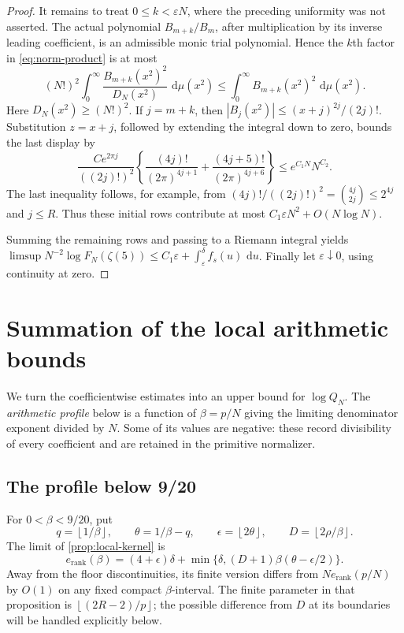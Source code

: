 \documentclass[11pt,letterpaper]{article}
\theoremstyle{definition}
\newcommand{\dd}{\,\mathrm d}
\newcommand{\floor}[1]{\left\lfloor #1\right\rfloor}
\begin{document}
\begin{proof}
It remains to treat $0\le k<\varepsilon N$, where the preceding uniformity
was not asserted. The actual polynomial $B_{m+k}/B_m$, after multiplication
by its inverse leading coefficient, is an admissible monic trial
polynomial. Hence the $k$th factor in \eqref{eq:norm-product} is at most
\[
 (N!)^2\int_0^\infty\frac{B_{m+k}(x^2)^2}{D_N(x^2)}
                         \,\dd\mu(x^2)
 \le\int_0^\infty B_{m+k}(x^2)^2\,\dd\mu(x^2).
\]
Here $D_N(x^2)\ge(N!)^2$. If $j=m+k$, then
$|B_j(x^2)|\le(x+j)^{2j}/(2j)!$. Substitution $z=x+j$, followed by extending
the integral down to zero, bounds the last display by
\[
 \frac{Ce^{2\pi j}}{((2j)!)^2}
 \left\{\frac{(4j)!}{(2\pi)^{4j+1}}
       +\frac{(4j+5)!}{(2\pi)^{4j+6}}\right\}
 \le e^{C_1N}N^{C_2}.
\]
The last inequality follows, for example, from
$(4j)!/((2j)!)^2=\binom{4j}{2j}\le2^{4j}$ and $j\le R$.
Thus these initial rows contribute at most
$C_1\varepsilon N^2+O(N\log N)$.

Summing the remaining rows and passing to a Riemann integral yields
$\limsup N^{-2}\log F_N(\zeta(5))
\le C_1\varepsilon+\int_\varepsilon^\delta f_s(u)\,\dd u$.
Finally let $\varepsilon\downarrow0$, using continuity at zero.
\end{proof}


\section{Summation of the local arithmetic bounds}\label{sec:arithmetic}

We turn the coefficientwise estimates into an upper bound for
$\log Q_N$. The \emph{arithmetic profile} below is a function of
$\beta=p/N$ giving the limiting denominator exponent divided by $N$.
Some of its values are negative: these record divisibility of every
coefficient and are retained in the primitive normalizer.

\subsection{The profile below 9/20}
For $0<\beta<9/20$, put
\[
 q=\floor{1/\beta},\qquad
 \theta=1/\beta-q,\qquad
 \epsilon=\floor{2\theta},\qquad
 D=\floor{2\rho/\beta}.
\]
The limit of \cref{prop:local-kernel} is
\begin{equation}\label{eq:rank-profile}
 e_{\mathrm{rank}}(\beta)
 =(4+\epsilon)\delta+
 \min\{\delta,(D+1)\beta(\theta-\epsilon/2)\}.
\end{equation}
Away from the floor discontinuities, its finite version differs from
$Ne_{\mathrm{rank}}(p/N)$ by $O(1)$ on any fixed compact $\beta$-interval.
The finite parameter in that proposition is
$\floor{(2R-2)/p}$; the possible difference from $D$ at its boundaries
will be handled explicitly below.
\end{document}
